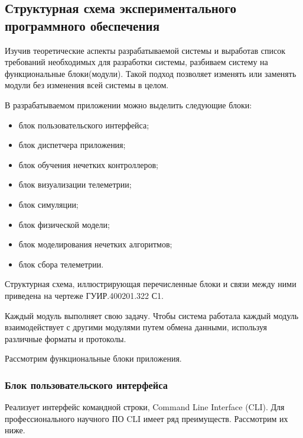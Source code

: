 \subsection{Структурная схема экспериментального программного обеспечения}
\label{sub:sys:4}

Изучив теоретические аспекты разрабатываемой системы и выработав список требований необходимых для разработки системы, разбиваем систему на функциональные блоки(модули). Такой подход позволяет изменять или заменять модули без изменения всей системы в целом.

В разрабатываемом приложении можно выделить следующие блоки:

\begin{itemize}
  \item блок пользовательского интерфейса;
  \item блок диспетчера приложения;
  \item блок обучения нечетких контроллеров;
  \item блок визуализации телеметрии;
  \item блок симуляции;
  \item блок физической модели;
  \item блок моделирования нечетких алгоритмов;
  \item блок сбора телеметрии.
\end{itemize}

Структурная схема, иллюстрирующая перечисленные блоки и связи между ними приведена на чертеже ГУИР.400201.322 С1.

Каждый модуль выполняет свою задачу. Чтобы система работала каждый модуль взаимодействует с другими модулями путем обмена данными, используя различные форматы и протоколы.

Рассмотрим функциональные блоки приложения.

\subsubsection{Блок пользовательского интерфейса}

Реализует интерфейс командной строки, Command Line Interface (CLI). Для профессионального научного ПО CLI имеет ряд преимуществ. Рассмотрим их ниже.


